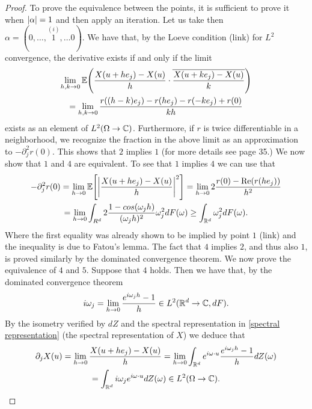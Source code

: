 \documentclass[12pt]{article}
\begin{document}
\begin{proof}
    To prove the equivalence between the points, it is sufficient to prove it when $\abs{\alpha}=1$ and then apply an iteration. Let us take then\\ $\alpha=(0,\ldots,\overset{(i)}{1},\ldots 0)$. We have that, by the Loeve condition (link) for $L^2$ convergence, the derivative exists if and only if the limit
    \begin{multline*}
        \lim_{h,k \to 0}\mathbb{E}\qty(\frac{X(u+he_j)-X(u)}{h}\cdot\overline{\frac{X(u+ke_j)-X(u)}{k}})\\=
        \lim_{h,k \to 0}\frac{r((h-k)e_j)-r(he_j)-r(-ke_j)+r(0)}{kh}
    \end{multline*}
    exists as an element of $L^2(\Omega\to\mathbb{C})$. Furthermore, if $r$ is twice differentiable in a neighborhood, we recognize the fraction in the above limit as an approximation to $-\partial_j^2r(0)$. This shows that $2$ implies  $1$ (for more details see \cite{lindgren2012stationary} page 35.) We now show that $1$ and $4$ are equivalent. To see that $1$ implies  $4$ we can use that
    \begin{multline*}
        -\partial_j^2 r(0)=\lim_{h \to 0}\mathbb{E}\qty[\abs{\frac{X(u+he_j)-X(u)}{h}}^2]=\lim_{h \to 0}2\frac{r(0)-\Re(r(he_j))}{h^2}\\=\lim_{h\to 0}
        \int_{R^d}2\frac{1-cos(\omega_j h)}{(\omega_jh)^2}\omega_j^2dF(\omega)\geq\int_{{\mathbb R}^d}\omega_j^2dF(\omega).
    \end{multline*}
    Where the first equality was already shown to be implied by point $1$ (link) and the inequality is due to Fatou's lemma. The fact that $4$ implies $2$, and thus also $1$, is proved similarly by the dominated convergence theorem.  We now prove the equivalence of $4$ and $5$. Suppose that  $4$ holds. Then we have  that, by the dominated convergence theorem
    \begin{equation*}
        i\omega_j=\lim_{h\to 0}\frac{e^{i\omega_j h}-1}{h}\in L^2({\mathbb R}^d\to\mathbb{C},dF).
    \end{equation*}
    By the isometry verified by $dZ$  and the spectral representation in \eqref{spectral representation} (the spectral representation of $X$)   we deduce that
    \begin{multline*}
        \partial_j X(u)=\lim_{h \to 0}\frac{X(u+he_j)-X(u)}{h}=\lim_{h \to 0}\int_{\R^d}e^{i\omega\cdot u} \frac{e^{i\omega_j h}-1}{h} dZ(\omega)\\
        =\int_{\R^d}i\omega_j e^{i\omega\cdot u}dZ(\omega)\in L^2(\Omega\to\C).

\end{multline*}
\end{proof}
\end{document}
